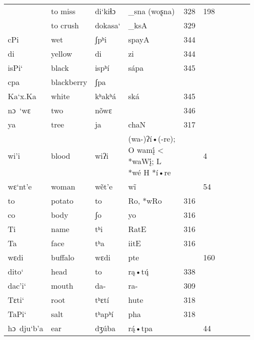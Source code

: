 \documentclass[oneside,a4paper,11pt]{article}
\newcommand{\ipa}[1]{{\phon#1}} %
\begin{document}
\begin{table}
\begin{tabular}{llllllllll}
	\ipa{} &	to miss & 	\ipa{di`kiɬɔ~} &	\ipa{_sna (woʂna)} &	328 & 	198 & 	\\
	\ipa{} &	to crush & 	\ipa{dokasa`} &	\ipa{_ksA} &	329 & 	 & 	\\
	\ipa{cPi} &	wet & 	\ipa{ʃpʰi} &	\ipa{spayA} &	344 & 	 & 	\\
	\ipa{di} &	yellow & 	\ipa{di} &	\ipa{zi} &	344 & 	 & 	\\
	\ipa{isPi`} &	black & 	\ipa{ispʰí} &	\ipa{sápa} &	345 & 	 & 	\\
	\ipa{cpa} &	blackberry & 	\ipa{ʃpa} &	\ipa{} &	 & 	 & 	\\
	\ipa{Ka`x.Ka} &	white & 	\ipa{kʰakʰá} &	\ipa{ská} &	345 & 	 & 	\\
	\ipa{nɔ~`wɛ} &	two & 	\ipa{nõwɛ} &	\ipa{} &	346 & 	 & 	\\
	\ipa{ya} &	tree & 	\ipa{ja} &	\ipa{chaN} &	317 & 	 & 	\\
	\ipa{wi'i} &	blood & 	\ipa{wiʔi} &	\ipa{*(wa-)ʔí•(-re); O wamį́ < *waWį́; L *wé H *í•re} &	 & 	4 & 	\\
	\ipa{wɛ`nt'e} &	woman & 	\ipa{wẽt'e} &	\ipa{*wĩ} &	 & 	54 & 	\\
	\ipa{to} &	potato & 	\ipa{to} &	\ipa{*Ro, *wRo} &	316 & 	 & 	\\
	\ipa{co} &	body & 	\ipa{ʃo} &	\ipa{*yo} &	316 & 	 & 	\\
	\ipa{Ti} &	name & 	\ipa{tʰi} &	\ipa{*RatE} &	316 & 	 & 	\\
	\ipa{Ta} &	face & 	\ipa{tʰa} &	\ipa{*iitE} &	316 & 	 & 	\\
	\ipa{wɛdi} &	buffalo & 	\ipa{wɛdi} &	\ipa{*pte} &	 & 	160 & 	\\
	\ipa{dito`} &	head & 	\ipa{to} &	\ipa{*rą•tų́} &	338 & 	 & 	\\
	\ipa{dac'i`} &	mouth & 	\ipa{da-} &	\ipa{*ra-} &	309 & 	 & 	\\
	\ipa{Tɛti`} &	root & 	\ipa{tʰɛtí} &	\ipa{hute} &	318 & 	 & 	\\
	\ipa{TaPi`} &	salt & 	\ipa{tʰapʰí} &	\ipa{pha} &	318 & 	 & 	\\
	\ipa{hɔ~dju`b'a} &	ear & 	\ipa{dʒúba} &	\ipa{*rą́•tpa} &	 & 	44 & 	\\


\end{tabular}
\end{table}



\end{document}
